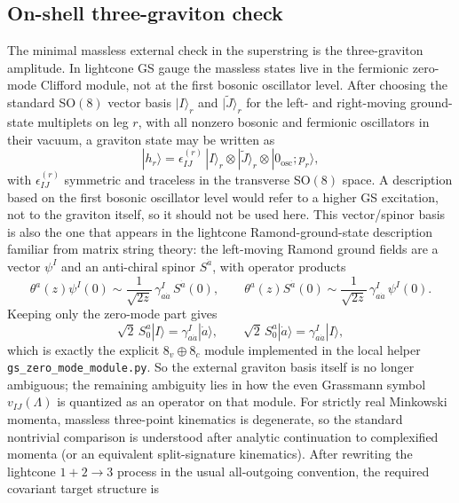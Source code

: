 \documentclass[11pt]{article}
\numberwithin{equation}{section}
\begin{document}
\subsection{On-shell three-graviton check}
The minimal massless external check in the superstring is the three-graviton amplitude. In lightcone GS gauge the massless states live in the fermionic zero-mode Clifford module, not at the first bosonic oscillator level. After choosing the standard SO$(8)$ vector basis $|I\rangle_r$ and $|\widetilde J\rangle_r$ for the left- and right-moving ground-state multiplets on leg $r$, with all nonzero bosonic and fermionic oscillators in their vacuum, a graviton state may be written as
\begin{equation}
\label{eq:s15-1-001}
|h_r\rangle
=
\epsilon_{IJ}^{(r)}\,
|I\rangle_r\otimes |\widetilde J\rangle_r\otimes |0_{\mathrm{osc}};p_r\rangle,
\end{equation}
with $\epsilon_{IJ}^{(r)}$ symmetric and traceless in the transverse SO$(8)$ space. A description based on the first bosonic oscillator level would refer to a higher GS excitation, not to the graviton itself, so it should not be used here. This vector/spinor basis is also the one that appears in the lightcone Ramond-ground-state description familiar from matrix string theory: the left-moving Ramond ground fields are a vector $\psi^I$ and an anti-chiral spinor $S^{\dot a}$, with operator products
\begin{equation}
\label{eq:s15-1-002}
\theta^a(z)\psi^I(0)\sim \frac{1}{\sqrt{2z}}\,\gamma^{I}_{a\dot a}\,S^{\dot a}(0),
\qquad
\theta^a(z)S^{\dot a}(0)\sim \frac{1}{\sqrt{2z}}\,\gamma^{I}_{a\dot a}\,\psi^I(0).
\end{equation}
Keeping only the zero-mode part gives
\begin{equation}
\label{eq:s15-1-003}
\sqrt2\,S_0^a|I\rangle = \gamma^I_{a\dot a}|\dot a\rangle,
\qquad
\sqrt2\,S_0^a|\dot a\rangle = \gamma^I_{a\dot a}|I\rangle,
\end{equation}
which is exactly the explicit $8_v\oplus 8_c$ module implemented in the local helper \texttt{gs\_zero\_mode\_module.py}. So the external graviton basis itself is no longer ambiguous; the remaining ambiguity lies in how the even Grassmann symbol $v_{IJ}(\Lambda)$ is quantized as an operator on that module. For strictly real Minkowski momenta, massless three-point kinematics is degenerate, so the standard nontrivial comparison is understood after analytic continuation to complexified momenta (or an equivalent split-signature kinematics). After rewriting the lightcone $1+2\to 3$ process in the usual all-outgoing convention, the required covariant target structure is
\end{document}
